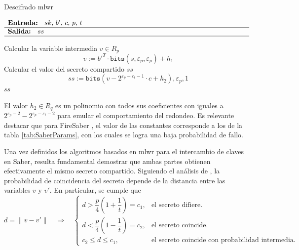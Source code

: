\begin{algorithm}[H]
	\caption{Descifrado \gls{mlwr}} 
	$\begin{array}{p{\textwidth}}
		\textbf{Entrada: } \(sk\), \(b'\), \(c\), \(p\), \(t\)\\ 
		\hline
		\textbf{Salida: } \(ss\)\\ 
		\hline
	\end{array}$
	\begin{algorithmic}[1]
		\State Calcular la variable intermedia \(v\in R_p\)
		\begin{equation}
			v:=b'^T \cdot \texttt{bits}(s,\varepsilon_p,\varepsilon_p)+ h_1 
		\end{equation}
		\State Calcular el valor del secreto compartido \(ss\)
		\begin{equation}
			ss:=\texttt{bits}(v-2^{\varepsilon_p-\varepsilon_t-1}\cdot c+ h_2),\varepsilon_p,1
		\end{equation}
		\State \Return \(ss\)
	\end{algorithmic}
\end{algorithm}

El valor \(h_2\in  R_q\) es un polinomio con todos sus coeficientes con iguales a \(2^{\varepsilon_p-2}-2^{\varepsilon_p-\varepsilon_t-2}\) para emular el comportamiento del redondeo. Es relevante destacar que para FireSaber \cite{saber-spec-2020}, el valor de las constantes corresponde a los de la tabla \ref{tab:SaberParams}, con los cuales se logra una baja probabilidad de fallo.
\newline

Una vez definidos los algoritmos basados en \gls{mlwr} para el intercambio de claves en Saber, resulta fundamental demostrar que ambas partes obtienen efectivamente el mismo secreto compartido.  Siguiendo el análisis de \cite{Correctness}, la probabilidad de coincidencia del secreto depende de la distancia entre las variables \(v\) y \(v'\). En particular, se cumple que
\begin{equation}
	d = \|v - v'\| \quad \Rightarrow \quad
	\begin{cases}
		d > \dfrac{p}{4}\left(1+\dfrac{1}{t}\right) = c_1, & \text{el secreto difiere}. \\[2ex]
		d < \dfrac{p}{4}\left(1-\dfrac{1}{t}\right) = c_2, & \text{el secreto coincide}. \\[2ex]
		c_2 \leq d \leq c_1, & \text{el secreto coincide con probabilidad intermedia}.
	\end{cases}
\end{equation}

